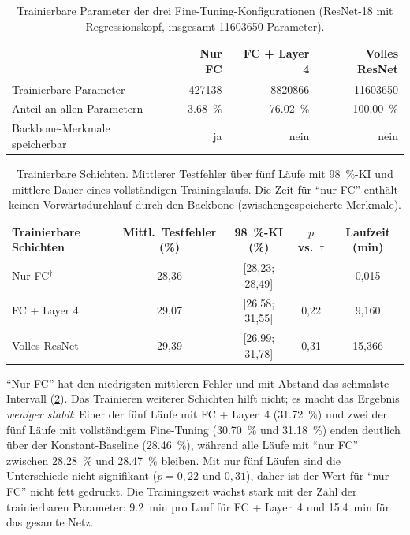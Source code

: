 \documentclass[
  11pt,
  a4paper,
  oneside,
  DIV=12,
  BCOR=8mm,
  parskip=half,
  headings=normal,
  bibliography=totoc,
  listof=totoc
]{scrreprt}
\newcommand{\sel}{\ensuremath{^{\dagger}}}
\begin{document}
\begin{table}[htbp]
  \centering
  \caption{Trainierbare Parameter der drei Fine-Tuning-Konfigurationen
           (ResNet-18 mit Regressionskopf, insgesamt \num{11603650}
           Parameter).}
  \label{tab:params}
  \small
  \begin{tabular}{lrrr}
    \toprule
    & Nur FC & FC + Layer 4 & Volles ResNet \\
    \midrule
    Trainierbare Parameter         & \num{427138} & \num{8820866} & \num{11603650} \\
    Anteil an allen Parametern     & \SI{3,68}{\percent} & \SI{76,02}{\percent} & \SI{100,00}{\percent} \\
    Backbone-Merkmale speicherbar  & ja & nein & nein \\
    \bottomrule
  \end{tabular}
\end{table}

\begin{table}[htbp]
  \centering
  \caption{Trainierbare Schichten. Mittlerer Testfehler über fünf Läufe mit
           \SI{98}{\percent}-KI und mittlere Dauer eines vollständigen
           Trainingslaufs. Die Zeit für \enquote{nur FC} enthält keinen
           Vorwärtsdurchlauf durch den Backbone (zwischengespeicherte
           Merkmale).}
  \label{tab:layers}
  \small
  \begin{tabular}{lcccc}
    \toprule
    Trainierbare Schichten & Mittl.\ Testfehler (\%) & \SI{98}{\percent}-KI (\%) & $p$ vs.\ $\dagger$ & Laufzeit (min) \\
    \midrule
    Nur FC\sel{}           & 28,36 & [28,23; 28,49] & ---  & 0,015 \\
    FC + Layer 4           & 29,07 & [26,58; 31,55] & 0,22 & 9,160 \\
    Volles ResNet          & 29,39 & [26,99; 31,78] & 0,31 & 15,366 \\
    \bottomrule
  \end{tabular}
\end{table}

\enquote{Nur FC} hat den niedrigsten mittleren Fehler und mit Abstand das
schmalste Intervall (\cref{tab:layers}). Das Trainieren weiterer Schichten
hilft nicht; es macht das Ergebnis \emph{weniger stabil}: Einer der fünf
Läufe mit FC + Layer~4 (\SI{31,72}{\percent}) und zwei der fünf Läufe mit
vollständigem Fine-Tuning (\SI{30,70}{\percent} und \SI{31,18}{\percent})
enden deutlich über der Konstant-Baseline (\SI{28,46}{\percent}), während alle
Läufe mit \enquote{nur FC} zwischen \SI{28,28}{\percent} und
\SI{28,47}{\percent} bleiben. Mit nur fünf Läufen sind die Unterschiede nicht
signifikant ($p=0,22$ und $0,31$), daher ist der Wert für \enquote{nur FC}
nicht fett gedruckt. Die Trainingszeit wächst stark mit der Zahl der
trainierbaren Parameter: \SI{9,2}{\minute} pro Lauf für FC + Layer~4 und
\SI{15,4}{\minute} für das gesamte Netz.
\end{document}
